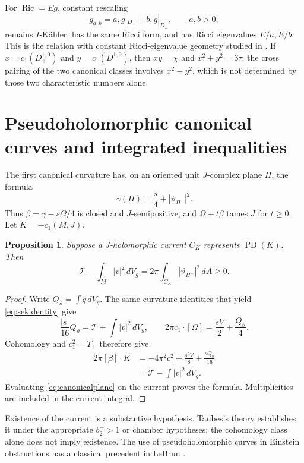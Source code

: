 \documentclass[11pt,a4paper]{article}
\newtheorem{proposition}[theorem]{Proposition}
\theoremstyle{definition}
\theoremstyle{remark}
\newcommand{\Ric}{\operatorname{Ric}}
\newcommand{\dd}{\,dV_g}
\newcommand{\cT}{\mathcal T}
\begin{document}
For $\Ric=Eg$, constant rescaling
\[
 g_{a,b}=a,g|_{D_+}+b,g|_{D_-},\qquad a,b>0,
\]
remains $I$-K\"ahler, has the same Ricci form, and has Ricci eigenvalues $E/a,E/b$. This is the relation with constant Ricci-eigenvalue geometry studied in \cite{ADM}. If $x=c_1(D_+^{1,0})$ and $y=c_1(D_-^{1,0})$, then $xy=\chi$ and $x^2+y^2=3\tau$; the cross pairing of the two canonical classes involves $x^2-y^2$, which is not determined by those two characteristic numbers alone.

\section{Pseudoholomorphic canonical curves and integrated inequalities}
The first canonical curvature has, on an oriented unit $J$-complex plane $\Pi$, the formula
\begin{equation}\label{eq:canonicalplane}
 \gamma(\Pi)=\frac s4+|\vartheta_{\Pi^\perp}|^2.
\end{equation}
Thus $\beta=\gamma-s\Omega/4$ is closed and $J$-semipositive, and $\Omega+t\beta$ tames $J$ for $t\ge0$. Let $K=-c_1(M,J)$.

\begin{proposition}\label{prop:canonicalcurrent}
Suppose a $J$-holomorphic current $C_K$ represents $\operatorname{PD}(K)$. Then
\begin{equation}\label{eq:canonicalinequality}
 \cT-\int_M|v|^2\dd
 =2\pi\int_{C_K}|\vartheta_{\Pi^\perp}|^2\,dA\ge0.
\end{equation}
\end{proposition}
\begin{proof}
Write $Q_\vartheta=\int q\dd$. The same curvature identities that yield \eqref{eq:sekidentity} give
\begin{equation}\label{eq:auxcanonical}
 \frac{|s|}{16}Q_\vartheta=\cT+\int|v|^2\dd,\qquad
 2\pi c_1\cdot[\Omega]=\frac{sV}{2}+\frac{Q_\vartheta}{4}.
\end{equation}
Cohomology and $c_1^2=T_+$ therefore give
\begin{align*}
 2\pi[\beta]\cdot K
 &=-4\pi^2c_1^2+\frac{s^2V}{8}+\frac{sQ_\vartheta}{16}\\
 &=\cT-\int|v|^2\dd.
\end{align*}
Evaluating \eqref{eq:canonicalplane} on the current proves the formula. Multiplicities are included in the current integral.
\end{proof}
Existence of the current is a substantive hypothesis. Taubes's theory establishes it under the appropriate $b_2^+>1$ or chamber hypotheses; the cohomology class alone does not imply existence. The use of pseudoholomorphic curves in Einstein obstructions has a classical precedent in LeBrun \cite{LeBrunCurves}.
\end{document}
